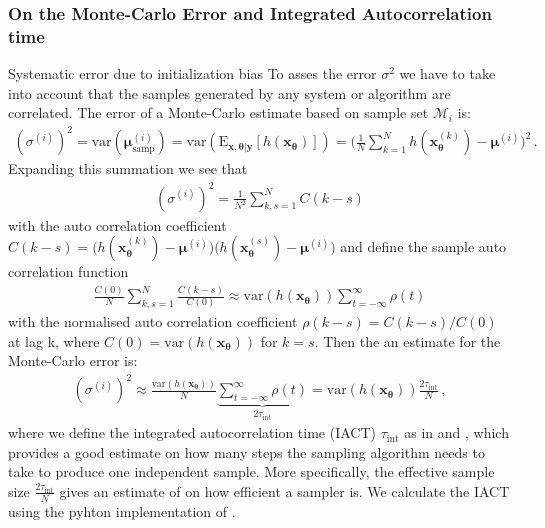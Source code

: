 \subsubsection{On the Monte-Carlo Error and Integrated Autocorrelation time}
Systematic error due to initialization bias
To asses the error $\sigma^2$  we have to take into account that the samples generated by any system or algorithm are correlated.
The error of a Monte-Carlo estimate based on sample set $\mathcal{M}_i$ is:
\begin{align}
	(\sigma^{(i)})^2 = \text{var}(\bm{\mu}^{(i)}_{\text{samp}} ) =  \text{var}(\text{E}_{\bm{x},\bm{\theta}|\bm{y}} [h(\bm{x}_{\bm{\theta}})]) = \Bigg( \frac{1}{N} \sum_{k=1}^{N} h(\bm{x}^{(k)}_{\bm{\theta}}) - \bm{\mu}^{(i)} \Bigg)^2 \, .
\end{align}
Expanding this summation we see that
\begin{align}
	(\sigma^{(i)})^2	= \frac{1}{N^2} \sum_{k,s=1}^{N} C(k-s)
\end{align}
with the auto correlation coefficient $C(k-s) =  \big( h(\bm{x}^{(k)}_{\bm{\theta}}) - \bm{\mu}^{(i)} \big) \big(h(\bm{x}^{(s)}_{\bm{\theta}}) - \bm{\mu}^{(i)} \big)$ and define the sample auto correlation function
\begin{align}
	\frac{C(0)}{N} \sum_{k,s=1}^{N} \frac{C(k-s)}{C(0)} \approx \text{var}(h(\bm{x}_{\bm{\theta}}) ) \sum_{t = - \infty }^{\infty} \rho(t)
\end{align}
with the normalised auto correlation coefficient $\rho(k-s) =  C(k-s)/ C(0)$ at lag k, where $C(0) = \text{var}(h(\bm{x}_{\bm{\theta}}) )$ for $k = s$.
Then the an estimate for the Monte-Carlo error is:
\begin{align}
	(\sigma^{(i)})^2   \approx  \frac{\text{var}(h(\bm{x}_{\bm{\theta}}) )}{N} \underbrace{\sum_{t = - \infty }^{\infty} \rho(t)}_{	2\tau_{\text{int}} } = \text{var}(h(\bm{x}_{\bm{\theta}})) \frac{ 2 \tau_{\text{int}} }{N} \, , \label{eq:MCerr}
\end{align}
where we define the integrated autocorrelation time (IACT) $\tau_{\text{int}}$ as in \cite{Sokal1997} and \cite{}, which provides a good estimate on how many steps the sampling algorithm needs to take to produce one independent sample.
More specifically, the effective sample size $\frac{ 2 \tau_{\text{int}} }{N}$ gives an estimate of on how efficient a sampler is.
We calculate the IACT using the pyhton implementation of \cite{wolff2004monte}.


